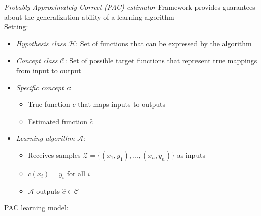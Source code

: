 \emph{Probably Approximately Correct (PAC) estimator}
Framework provides guarantees about the generalization ability of a learning algorithm\\
Setting:
\begin{itemize}
    \item \emph{Hypothesis class $\mathcal{H}$}: Set of functions that can be expressed by the algorithm
    \item \emph{Concept class $\mathcal{C}$}: Set of possible target functions that represent true mappings from input to output
    \item \emph{Specific concept $c$}:
    \begin{itemize}
        \item True function $c$ that maps inputs to outputs
        \item Estimated function $\hat{c}$
    \end{itemize}
    \item \emph{Learning algorithm $\mathcal{A}$}:
    \begin{itemize}
        \item Receives samples $\mathcal{Z} = \{(x_1, y_1), \ldots, (x_n, y_n)\}$ as inputs
        \item $c(x_i) = y_i$ for all $i$
        \item $\mathcal{A}$ outputs $\hat{c} \in \mathcal{C}$
    \end{itemize}
\end{itemize}
PAC learning model:

